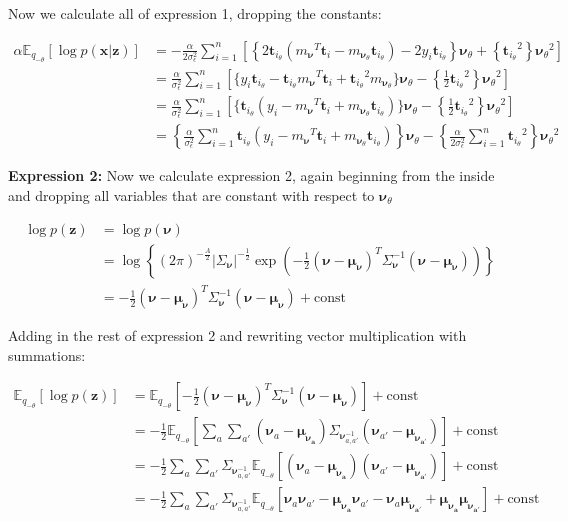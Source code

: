\documentclass[letterpaper,12pt]{article}
\newcommand{\lc}{\left \{} %
\newcommand{\rc}{\right \}} %
\newcommand{\lp}{\left (} %
\newcommand{\rp}{\right )} %
\newcommand{\lb}{\left [} %
\newcommand{\rb}{\right ]} %
\newcommand{\pz}{\ensuremath{p(\boldsymbol{z})}}
\newcommand{\pxgivenz}{\ensuremath{p(\boldsymbol{x} | \boldsymbol{z})}}
\newcommand{\sigmaepsilon}{\sigma_\epsilon^2} %
\newcommand{\nuv}{\boldsymbol{\nu}} %
\newcommand{\ti}{\boldsymbol{t}_i} %
\newcommand{\meannu}{\ensuremath{\boldsymbol{\mu_\nuv}}} %
\newcommand{\Sigmanu}{\Sigma_{\nuv}} %
\newcommand{\mnu}{\ensuremath{m_\nuv}} %
\newcommand{\nua}{\ensuremath{\nuv_a}} %
\newcommand{\nuaprime}{\ensuremath{\nuv_{a'}}} %
\newcommand{\meananu}{\ensuremath{\boldsymbol{\mu_{\nuv_a}}}} %
\newcommand{\meanaprimenu}{\ensuremath{\boldsymbol{\mu_{\nuv_{a'}}}}} %
\newcommand{\tthetatilde}{\ensuremath{\boldsymbol{t}_{i_\theta}}} %
\newcommand{\nutheta}{\ensuremath{\nuv_\theta}} %
\newcommand{\mnusub}[1]{\ensuremath{m_{\nuv_#1}}} %
\newcommand{\Etheta}{\ensuremath{\mathbb{E}_{q_{-\theta}}}} %
\newcommand{\el}{\left[} %
\newcommand{\er}{\right]} %
\begin{document}
Now we calculate all of expression 1, dropping the constants:

\begin{equation}
\begin{split}
    \alpha \Etheta \el \log \pxgivenz \er &= - \frac{\alpha}{2 \sigmaepsilon} \sum_{i=1}^n \lb \lc 2 \tthetatilde \lp {\mnu}^T \ti - \mnusub{\theta} \ti_\theta \rp - 2 y_i \tthetatilde  \rc \nutheta + \lc \tthetatilde^2 \rc \nutheta^2  \rb \\
    &= \frac{\alpha}{ \sigmaepsilon} \sum_{i=1}^n \lb \bigg\{ y_i \tthetatilde - \tthetatilde {\mnu}^T \ti + \tthetatilde^2 \mnusub{\theta} \bigg\} \nutheta - \lc \frac{1}{2} \tthetatilde^2 \rc \nutheta^2  \rb \\
    &= \frac{\alpha}{ \sigmaepsilon} \sum_{i=1}^n \lb \bigg\{ \tthetatilde \lp y_i - {\mnu}^T \ti + \mnusub{\theta} \tthetatilde \rp \bigg\} \nutheta - \lc \frac{1}{2} \tthetatilde^2 \rc \nutheta^2  \rb \\
    &= \lc  \frac{\alpha}{ \sigmaepsilon} \sum_{i=1}^n \tthetatilde \lp y_i - {\mnu}^T \ti + \mnusub{\theta} \tthetatilde \rp \rc \nutheta - \lc \frac{\alpha}{2 \sigmaepsilon} \sum_{i=1}^n \tthetatilde^2 \rc \nutheta^2
\end{split}
\end{equation}

\noindent \textbf{Expression 2:} Now we calculate expression 2, again beginning from the inside and dropping all variables that are constant with respect to $\nutheta$

\begin{equation}
\begin{split}
    \log \pz &= \log p(\nuv) \\
    &= \log \lc \lp 2 \pi \rp ^{-\frac{A}{2}} | \Sigmanu |^{-\frac{1}{2}} \exp \lp - \frac{1}{2} \lp \nuv - \meannu \rp^T \Sigmanu^{-1} \lp \nuv - \meannu \rp \rp \rc \\
    &= - \frac{1}{2} \lp \nuv - \meannu \rp^T \Sigmanu^{-1} \lp \nuv - \meannu \rp + \text{const}
\end{split}
\end{equation}

Adding in the rest of expression 2 and rewriting vector multiplication with summations:

\begin{equation}
\begin{split}
    \Etheta \el \log \pz \er &= \Etheta \el - \frac{1}{2} \lp \nuv - \meannu \rp^T \Sigmanu^{-1} \lp \nuv - \meannu \rp \er + \text{const} \\
    &= -\frac{1}{2} \Etheta \lb \sum_a \sum_{a'} \lp \nua - \meananu \rp \Sigmanu_{a,a'}^{-1} \lp \nuaprime - \meanaprimenu \rp \rb + \text{const} \\
    &= - \frac{1}{2} \sum_a \sum_{a'}  \Sigmanu_{a,a'}^{-1} \Etheta  \lb \lp \nua - \meananu \rp \lp \nuaprime - \meanaprimenu \rp \rb + \text{const} \\
    &= - \frac{1}{2} \sum_a \sum_{a'}  \Sigmanu_{a,a'}^{-1} \Etheta  \lb \nua \nuaprime - \meananu\nuaprime - \nua \meanaprimenu + \meananu \meanaprimenu \rb + \text{const} \\
\end{split}
\end{equation}
\end{document}
